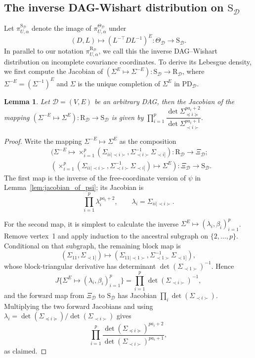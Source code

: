 \documentclass[12pt]{article}
\newcommand{\D}{\mathcal{D}}
\theoremstyle{plain}
\newtheorem{lemma}[theorem]{Lemma}
\theoremstyle{definition}
\theoremstyle{remark}
\begin{document}
\subsection{The inverse DAG-Wishart distribution on $\mathrm{S}_{\D}$}\label{sub:wsg}

Let $\pi_{U,\alpha}^{\mathrm{S}_{\D}}$ denote the image of
$\pi_{U,\alpha}^{\Theta_{\D}}$ under
\[
(D,L)\longmapsto (L^{-\top}DL^{-1})^{E}:
\Theta_{\D}\longrightarrow \mathrm{S}_{\D}.
\]
In parallel to our notation $\pi_{U,\alpha}^{\mathrm{R}_{\D}}$, we call
this the inverse DAG--Wishart distribution on incomplete covariance
coordinates.  To derive its Lebesgue density, we first compute the
Jacobian of
$(\Sigma^{E}\mapsto\Sigma^{-E}):\mathrm{S}_{\D}\rightarrow
\mathrm{R}_{\D}$, where
\(\Sigma^{-E}=(\Sigma^{-1})^E\) and \(\Sigma\) is the unique completion
of \(\Sigma^E\) in \(\mathrm{PD}_{\D}\).

\begin{lemma}\label{lem:inverse_mapping}
Let $\D=(V,E)$  be an arbitrary DAG, then the Jacobian of the mapping $ (\Sigma^{-E}\mapsto \Sigma^{E}): \mathrm{R}_{\D}\rightarrow \mathrm{S}_{\D}$ is given by $\prod_{i=1}^{p}\dfrac{\det\Sigma_{\preceq i\succeq}^{pa_i+2}}{\det\Sigma_{\prec i\succ}^{pa_i+1}}$.
\end{lemma}

\begin{proof}
Write the mapping $\Sigma^{-E}\mapsto\Sigma^E$ as the composition
\begin{align*}
&(\Sigma^{-E}\mapsto\times_{i=1}^{p} (\Sigma_{ii|\prec i\succ}, \Sigma_{\prec i\succ}^{-1}\Sigma_{\prec i]}):\mathrm{R}_{\D}\rightarrow \Xi_{\D};\\
&(\times_{i=1}^{p}(\Sigma_{ii|\prec i\succ}, \Sigma_{\prec i\succ}^{-1}\Sigma_{\prec i]})\mapsto \Sigma^{E}):\Xi_{\D}\rightarrow \mathrm{S}_{\D}.
\end{align*}
The first map is the inverse of the free-coordinate version of $\psi$
in Lemma~\ref{lem:jacobian_of_psi}; its Jacobian is
\[
\prod_{i=1}^p\lambda_i^{pa_i+2},
\qquad \lambda_i=\Sigma_{ii\mid\prec i\succ}.
\]

For the second map, it is simplest to calculate the inverse
$\Sigma^E\mapsto(\lambda_i,\beta_i)_{i=1}^p$.  Remove vertex~1 and
apply induction to the ancestral subgraph on
$\{2,\ldots,p\}$.  Conditional on that subgraph, the remaining block
map is
\[
(\Sigma_{11},\Sigma_{\prec1]})
\longmapsto
\left(\Sigma_{11\mid\prec1\succ},
      \Sigma_{\prec1\succ}^{-1}\Sigma_{\prec1]}\right),
\]
whose block-triangular derivative has determinant
$\det(\Sigma_{\prec1\succ})^{-1}$.  Hence
\[
J\{\Sigma^E\mapsto(\lambda_i,\beta_i)_{i=1}^p\}
=\prod_{i=1}^p\det(\Sigma_{\prec i\succ})^{-1},
\]
and the forward map from $\Xi_{\D}$ to $\mathrm S_{\D}$ has Jacobian
$\prod_i\det(\Sigma_{\prec i\succ})$.  Multiplying the two forward
Jacobians and using
\(
\lambda_i=\det(\Sigma_{\preceq i\succeq})/
             \det(\Sigma_{\prec i\succ})
\)
gives
\[
\prod_{i=1}^{p}
\frac{\det(\Sigma_{\preceq i\succeq})^{pa_i+2}}
     {\det(\Sigma_{\prec i\succ})^{pa_i+1}},
\]
as claimed.
\end{proof}
\end{document}
